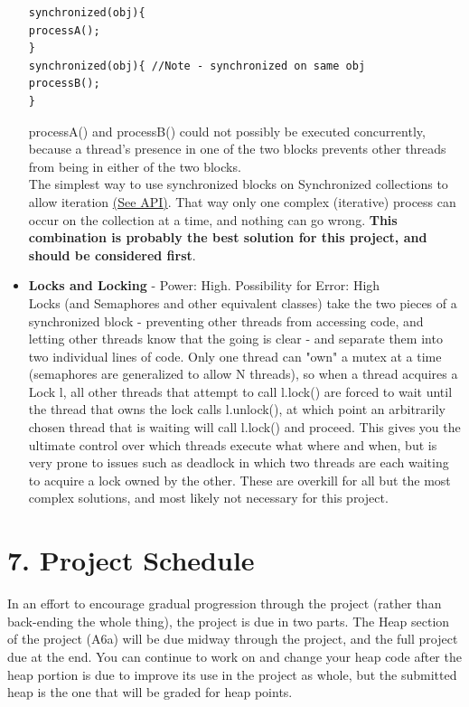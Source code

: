 \documentclass[11pt]{article}
\begin{document}
\begin{itemize}
\begin{lstlisting}[frame=single]
synchronized(obj){
processA();
}
synchronized(obj){ //Note - synchronized on same obj
processB();
}
\end{lstlisting}
processA() and processB() could not possibly be executed concurrently, because a thread's presence in one of the two blocks prevents other threads from being in either of the two blocks.\\
The simplest way to use synchronized blocks on Synchronized collections to allow iteration \href{http://docs.oracle.com/javase/7/docs/api/java/util/Collections.html\#synchronizedCollection(java.util.Collection)}{({\color{blue}\underline{See API}})}. That way only one complex (iterative) process can occur on the collection at a time, and nothing can go wrong. \textbf{This combination is probably the best solution for this project, and should be considered first}.
\item \textbf{Locks and Locking} - Power: High. Possibility for Error: High\\
Locks (and Semaphores and other equivalent classes) take the two pieces of a synchronized block - preventing other threads from accessing code, and letting other threads know that the going is clear - and separate them into two individual lines of code. Only one thread can "own" a mutex at a time (semaphores are generalized to allow N threads), so when a thread acquires a Lock l, all other threads that attempt to call l.lock() are forced to wait until the thread that owns the lock calls l.unlock(), at which point an arbitrarily chosen thread that is waiting will call l.lock() and proceed. This gives you the ultimate control over which threads execute what where and when, but is very prone to issues such as deadlock in which two threads are each waiting to acquire a lock owned by the other. These are overkill for all but the most complex solutions, and most likely not necessary for this project. 
\end{itemize}

\newpage
\section{7. Project Schedule}
In an effort to encourage gradual progression through the project (rather than back-ending the whole thing), the project is due in two parts. The Heap section of the project (A6a) will be due midway through the project, and the full project due at the end. You can continue to work on and change your heap code after the heap portion is due to improve its use in the project as whole, but the submitted heap is the one that will be graded for heap points.
\end{document}
